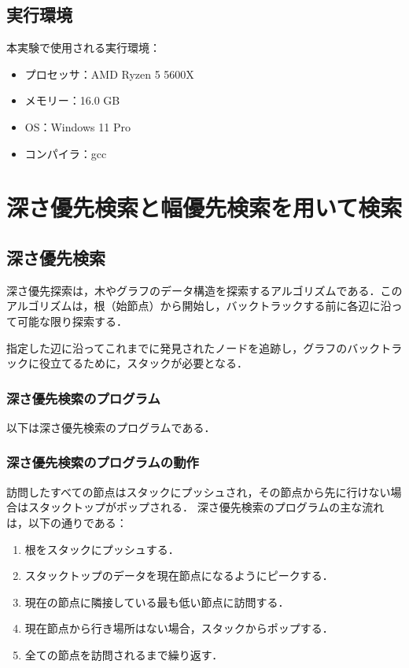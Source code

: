 \documentclass[a4j, titlepage]{jarticle}
\begin{document}
    
    \subsection{実行環境}
    本実験で使用される実行環境：
    \begin{screen}
        \begin{itemize}
            \item プロセッサ：AMD Ryzen 5 5600X
            \item メモリー：16.0 GB
            \item OS：Windows 11 Pro
            \item コンパイラ：gcc
        \end{itemize}    
    \end{screen}

\section{深さ優先検索と幅優先検索を用いて検索}
    \subsection{深さ優先検索}
    深さ優先探索は，木やグラフのデータ構造を探索するアルゴリズムである．このアルゴリズムは，根（始節点）から開始し，バックトラックする前に各辺に沿って可能な限り探索する．

    指定した辺に沿ってこれまでに発見されたノードを追跡し，グラフのバックトラックに役立てるために，スタックが必要となる．

        \subsubsection{深さ優先検索のプログラム}
        以下は深さ優先検索のプログラムである．
         
        
        \subsubsection{深さ優先検索のプログラムの動作}
        訪問したすべての節点はスタックにプッシュされ，その節点から先に行けない場合はスタックトップがポップされる．
        深さ優先検索のプログラムの主な流れは，以下の通りである：
        \begin{screen}
            \begin{enumerate}
                \item 根をスタックにプッシュする．
                \item スタックトップのデータを現在節点になるようにピークする．
                \item 現在の節点に隣接している最も低い節点に訪問する．
                \item 現在節点から行き場所はない場合，スタックからポップする．
                \item 全ての節点を訪問されるまで繰り返す．
            \end{enumerate}
        \end{screen}
        
\end{document}
